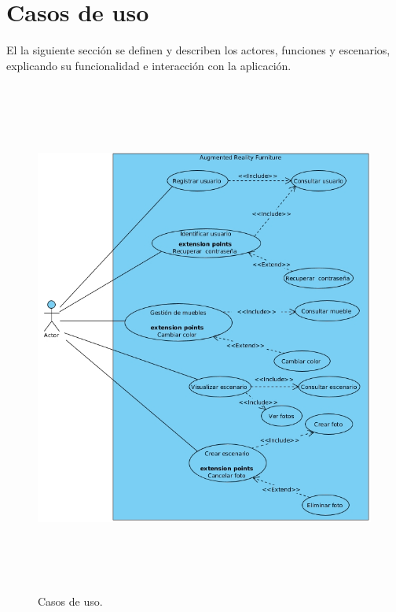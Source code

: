 
\newpage
\section{Casos de uso}
El la siguiente sección se definen y describen los actores, funciones y escenarios, explicando su funcionalidad e interacción con la aplicación.\par
\vspace{5mm}
\begin{figure}[h!]
	\centering
	\includegraphics[width=15cm,height=17cm]{imagenes/analisis/casosDeUso.jpg}
	\caption{Casos de uso.}
	\label{fig:analogo}
\end{figure}  
\newpage

